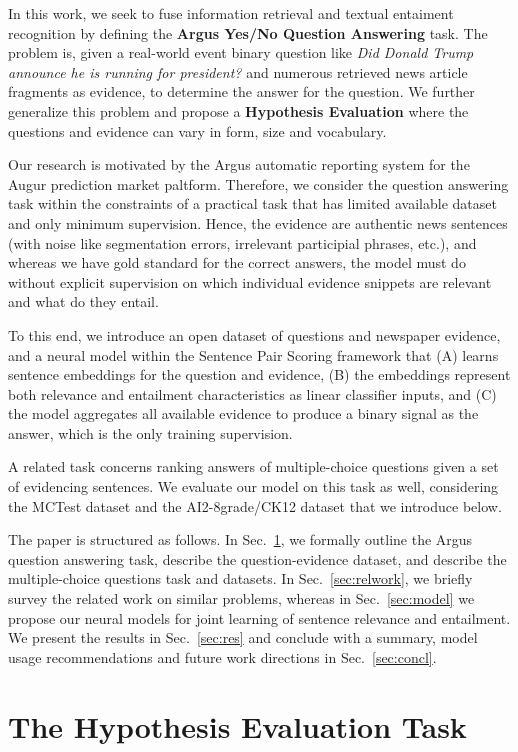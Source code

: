 \documentclass[11pt]{article}
\begin{document}
In this work, we seek to fuse information retrieval and textual entaiment
recognition by defining the \textbf{Argus Yes/No Question Answering} task.
The problem is, given a real-world event binary question like
\textit{Did Donald Trump announce he is running for president?}
and numerous retrieved news article fragments as evidence,
to determine the answer for the question.
We further generalize this problem and propose a \textbf{Hypothesis Evaluation}
where the questions and evidence can vary in form, size and vocabulary.

Our research is motivated by the Argus automatic reporting system for
the Augur prediction market paltform. \cite{argus}  Therefore, we consider the question answering task
within the constraints of a practical task that has limited available dataset
and only minimum supervision.  Hence, the evidence are authentic news
sentences (with noise like segmentation errors, irrelevant participial phrases, etc.),
and whereas we have gold standard for
the correct answers, the model must do without explicit supervision on
which individual evidence snippets are relevant and what do they entail.

To this end, we introduce an open dataset of questions and newspaper evidence,
and a neural model within the Sentence Pair Scoring framework \cite{sps}
that (A) learns sentence embeddings for the question and evidence,
(B) the embeddings represent both relevance and entailment characteristics
as linear classifier inputs, and (C) the model aggregates all available evidence
to produce a binary signal as the answer, which is the only training supervision.

A related task concerns ranking answers of multiple-choice questions given
a set of evidencing sentences.  We evaluate our model on this task as well,
considering the MCTest dataset and the AI2-8grade/CK12 dataset that we introduce
below.

The paper is structured as follows.  In Sec.~\ref{sec:argus}, we formally outline
the Argus question answering task, describe the question-evidence dataset,
and describe the multiple-choice questions task and datasets.
In Sec.~\ref{sec:relwork}, we briefly survey the related work on similar problems,
whereas in Sec.~\ref{sec:model} we propose our neural models for joint
learning of sentence relevance and entailment.  We present the results in Sec.~\ref{sec:res}
and conclude with a summary, model usage recommendations and future work directions in Sec.~\ref{sec:concl}.

\section{The Hypothesis Evaluation Task}
\label{sec:argus}
\end{document}
